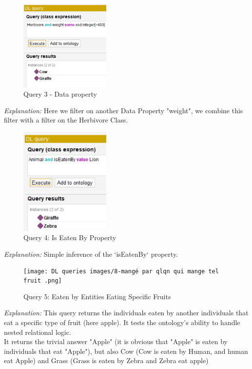 \begin{figure}[H]
  \centering
  \includegraphics[width=0.4\textwidth]{DL queries images/7-weight.png}
  \caption{Query 3 - Data property}
  \label{fig:query3}
\end{figure}
\textit{Explanation:} Here we filter on another Data Property "weight", we combine this filter with a filter on the Herbivore Class.

\begin{figure}[H]
  \centering
  \includegraphics[width=0.4\textwidth]{DL queries images/6-iseatenby.png}
  \caption{Query 4: Is Eaten By Property}
  \label{fig:query5}
\end{figure}
\textit{Explanation:} Simple inference of the `isEatenBy` property.

\begin{figure}[H]
  \centering
  \texttt{[image: DL queries images/8-mangé par qlqn qui mange tel fruit .png]}
  \caption{Query 5: Eaten by Entities Eating Specific Fruits}
  \label{fig:query4}
\end{figure}
\textit{Explanation:} This query returns the individuals eaten by another individuals that eat a specific type of fruit (here apple). It tests the ontology’s ability to handle nested relational logic. \\ It returns the trivial answer "Apple" (it is obvious that "Apple" is eaten by individuals that eat "Apple"), but also Cow (Cow is eaten by Human, and human eat Apple) and Grass (Grass is eaten by Zebra and Zebra eat apple)



